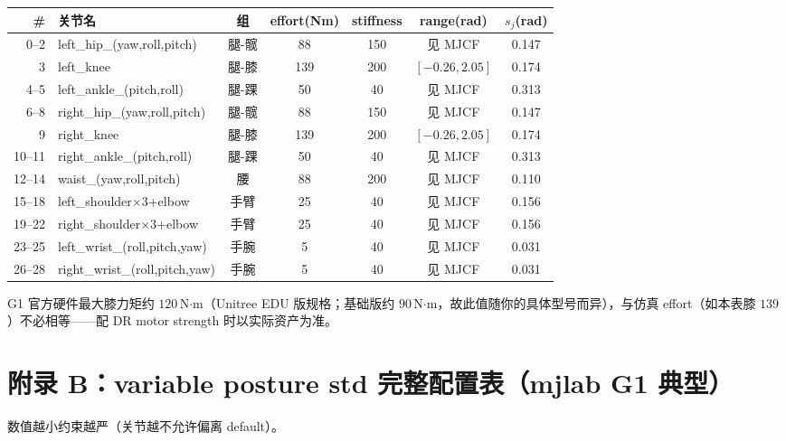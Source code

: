 \begin{center}
\scriptsize
\begin{tabular}{rlccccc}
\hline
\# & 关节名 & 组 & effort(Nm) & stiffness & range(rad) & $s_j$(rad) \\
\hline
0--2 & left\_hip\_(yaw,roll,pitch) & 腿-髋 & 88 & 150 & 见 MJCF & 0.147 \\
3 & left\_knee & 腿-膝 & 139 & 200 & $[-0.26,2.05]$ & 0.174 \\
4--5 & left\_ankle\_(pitch,roll) & 腿-踝 & 50 & 40 & 见 MJCF & 0.313 \\
6--8 & right\_hip\_(yaw,roll,pitch) & 腿-髋 & 88 & 150 & 见 MJCF & 0.147 \\
9 & right\_knee & 腿-膝 & 139 & 200 & $[-0.26,2.05]$ & 0.174 \\
10--11 & right\_ankle\_(pitch,roll) & 腿-踝 & 50 & 40 & 见 MJCF & 0.313 \\
12--14 & waist\_(yaw,roll,pitch) & 腰 & 88 & 200 & 见 MJCF & 0.110 \\
15--18 & left\_shoulder$\times3$+elbow & 手臂 & 25 & 40 & 见 MJCF & 0.156 \\
19--22 & right\_shoulder$\times3$+elbow & 手臂 & 25 & 40 & 见 MJCF & 0.156 \\
23--25 & left\_wrist\_(roll,pitch,yaw) & 手腕 & 5 & 40 & 见 MJCF & 0.031 \\
26--28 & right\_wrist\_(roll,pitch,yaw) & 手腕 & 5 & 40 & 见 MJCF & 0.031 \\
\hline
\end{tabular}
\end{center}

G1 官方硬件最大膝力矩约 $120$\,N$\cdot$m（Unitree EDU 版规格；基础版约 $90$\,N$\cdot$m，故此值随你的具体型号而异），与仿真 effort（如本表膝 $139$）不必相等——配 DR motor strength 时以实际资产为准。

\section*{附录 B：variable posture std 完整配置表（mjlab G1 典型）}

数值越小约束越严（关节越不允许偏离 default）。

